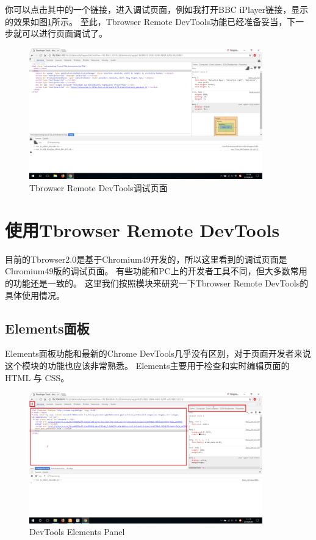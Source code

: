 你可以点击其中的一个链接，进入调试页面，例如我打开BBC iPlayer链接，显示的效果如图\ref{fig:debug_page}所示。
至此，Tbrowser Remote DevTools功能已经准备妥当，下一步就可以进行页面调试了。
\begin{figure}[H] 
\centering 
\includegraphics[width=0.9\textwidth]{image/devtools_study/debug_page.png} 
\caption{Tbrowser Remote DevTools调试页面} \label{fig:debug_page} 
\end{figure}

\section{使用Tbrowser Remote DevTools}
目前的Tbrowser2.0是基于Chromium49开发的，所以这里看到的调试页面是Chromium49版的调试页面。
有些功能和PC上的开发者工具不同，但大多数常用的功能还是一致的。
这里我们按照模块来研究一下Tbrowser Remote DevTools的具体使用情况。

\subsection{Elements面板}
Elements面板功能和最新的Chrome DevTools几乎没有区别，对于页面开发者来说这个模块的功能也应该非常熟悉。
Elements主要用于检查和实时编辑页面的 HTML 与 CSS。

\begin{figure}[H] 
\centering 
\includegraphics[width=0.9\textwidth]{image/devtools_study/elements_panel.png} 
\caption{DevTools Elements Panel} \label{fig:elements_panel} 
\end{figure}

